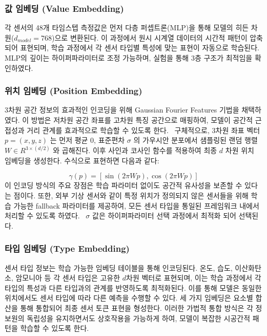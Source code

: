 \documentclass[final,5p,times,twocolumn,authoryear]{elsarticle}
\begin{document}


\subsubsection{값 임베딩 (Value Embedding)}
각 센서의 48개 타임스텝 측정값은 먼저 다층 퍼셉트론(MLP)을 통해 모델의 히든 차원($d_{model}=768$)으로 변환된다. 이 과정에서 원시 시계열 데이터의 시간적 패턴이 압축되어 표현되며, 학습 과정에서 각 센서 타입별 특성에 맞는 표현이 자동으로 학습된다. MLP의 깊이는 하이퍼파라미터로 조정 가능하며, 실험을 통해 3층 구조가 최적임을 확인하였다.


\subsubsection{위치 임베딩 (Position Embedding)}
3차원 공간 정보의 효과적인 인코딩을 위해 Gaussian Fourier Features 기법을 채택하였다. 이 방법은 저차원 공간 좌표를 고차원 특징 공간으로 매핑하여, 모델이 공간적 근접성과 거리 관계를 효과적으로 학습할 수 있도록 한다. 
구체적으로, 3차원 좌표 벡터 $p = (x, y, z)$ 는 먼저 평균 0, 표준편차 $\sigma$ 의 가우시안 분포에서 샘플링된 랜덤 행렬 $W  \in R^{3 \times (d/2)}$ 와 곱해진다. 이후 사인과 코사인 함수를 적용하여 최종 $d$ 차원 위치 임베딩을 생성한다. 수식으로 표현하면 다음과 같다:

\begin{equation}
    \gamma(p) = \left[\sin(2\pi W p), \cos(2\pi W p)\right]
\end{equation}
이 인코딩 방식의 주요 장점은 학습 파라미터 없이도 공간적 유사성을 보존할 수 있다는 점이다. 또한, 외부 기상 센서와 같이 특정 위치가 정의되지 않은 센서들을 위해 학습 가능한 fallback 파라미터를 제공하여, 모든 센서 타입을 통일된 프레임워크 내에서 처리할 수 있도록 하였다.  $\sigma$ 값은 하이퍼파라미터 선택 과정에서 최적화 되어 선택된다.


\subsubsection{타입 임베딩 (Type Embedding)}
센서 타입 정보는 학습 가능한 임베딩 테이블을 통해 인코딩된다. 온도, 습도, 이산화탄소, 암모니아 등 각 센서 타입은 고유한 $d$차원 벡터로 표현되며, 이는 학습 과정에서 각 타입의 특성과 다른 타입과의 관계를 반영하도록 최적화된다. 이를 통해 모델은 동일한 위치에서도 센서 타입에 따라 다른 예측을 수행할 수 있다.
세 가지 임베딩은 요소별 합산을 통해 통합되어 최종 센서 토큰 표현을 형성한다. 이러한 가법적 통합 방식은 각 정보원의 독립성을 유지하면서도 상호작용을 가능하게 하여, 모델이 복잡한 시공간적 패턴을 학습할 수 있도록 한다.
\end{document}
